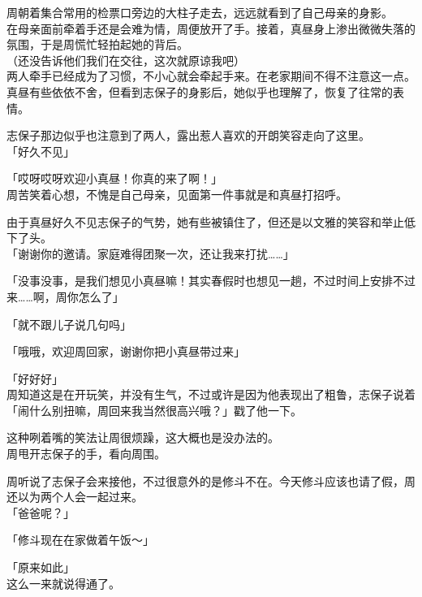 周朝着集合常用的检票口旁边的大柱子走去，远远就看到了自己母亲的身影。\\

在母亲面前牵着手还是会难为情，周便放开了手。接着，真昼身上渗出微微失落的氛围，于是周慌忙轻拍起她的背后。\\

（还没告诉他们我们在交往，这次就原谅我吧）\\

两人牵手已经成为了习惯，不小心就会牵起手来。在老家期间不得不注意这一点。\\

真昼有些依依不舍，但看到志保子的身影后，她似乎也理解了，恢复了往常的表情。

志保子那边似乎也注意到了两人，露出惹人喜欢的开朗笑容走向了这里。\\

「好久不见」

「哎呀哎呀欢迎小真昼！你真的来了啊！」\\

周苦笑着心想，不愧是自己母亲，见面第一件事就是和真昼打招呼。

由于真昼好久不见志保子的气势，她有些被镇住了，但还是以文雅的笑容和举止低下了头。\\

「谢谢你的邀请。家庭难得团聚一次，还让我来打扰……」

「没事没事，是我们想见小真昼嘛！其实春假时也想见一趟，不过时间上安排不过来……啊，周你怎么了」

「就不跟儿子说几句吗」

「哦哦，欢迎周回家，谢谢你把小真昼带过来」

「好好好」\\

周知道这是在开玩笑，并没有生气，不过或许是因为他表现出了粗鲁，志保子说着「闹什么别扭嘛，周回来我当然很高兴哦？」戳了他一下。

这种咧着嘴的笑法让周很烦躁，这大概也是没办法的。\\

周甩开志保子的手，看向周围。

周听说了志保子会来接他，不过很意外的是修斗不在。今天修斗应该也请了假，周还以为两个人会一起过来。\\

「爸爸呢？」

「修斗现在在家做着午饭～」

「原来如此」\\

这么一来就说得通了。

